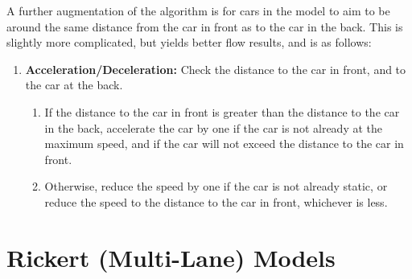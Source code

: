 \documentclass{article}
\begin{document}
A further augmentation of the algorithm is for cars in the model to aim to be around the same distance from the car in front as to the car in the back. This is slightly more complicated, but yields better flow results, and is as follows:
\begin{enumerate}[itemsep=0.1pt]
\item \textbf{Acceleration/Deceleration:} Check the distance to the car in front, and to the car at the back. \begin{enumerate}
\item If the distance to the car in front is greater than the distance to the car in the back, accelerate the car by one if the car is not already at the maximum speed, and if the car will not exceed the distance to the car in front.
\item Otherwise, reduce the speed by one if the car is not already static, or reduce the speed to the distance to the car in front, whichever is less.
\end{enumerate}

\end{enumerate}





\newpage
\section*{Rickert (Multi-Lane) Models}
\end{document}
